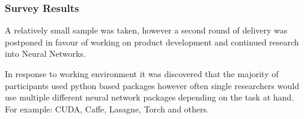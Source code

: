 \documentclass[a4paper,11pt,titlepage]{article}
\begin{document}
	\subsubsection{Survey Results}
	\par 
	A relatively small sample was taken, however a second round of delivery was postponed in favour of working on product development and continued research into Neural Networks.
	\par

	\begin{figure}[H]
	\end{figure}
	
	In response to working environment it was discovered that the majority of participants used python based packages however often single researchers would use multiple different neural network packages depending on the task at hand. For example: CUDA, Caffe, Lasagne, Torch and others. 
	\par 
	
	\begin{figure}[H]
	\end{figure}
	
\end{document}
